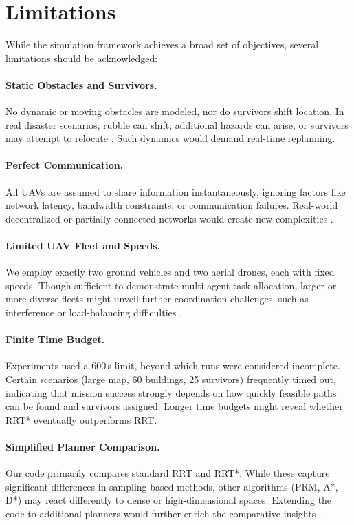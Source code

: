 \documentclass[12pt,a4paper]{report}
\begin{document}
\section{Limitations}
\label{sec:limitations}
While the simulation framework achieves a broad set of objectives, several limitations
should be acknowledged:

\paragraph{Static Obstacles and Survivors.}
No dynamic or moving obstacles are modeled, nor do survivors shift location. In real
disaster scenarios, rubble can shift, additional hazards can arise, or survivors may
attempt to relocate \cite{Auclair2021CollapseRisk,Oleynikova2018ReplanDynamic}. Such dynamics would demand real-time replanning.

\paragraph{Perfect Communication.}
All UAVs are assumed to share information instantaneously, ignoring factors like
network latency, bandwidth constraints, or communication failures. Real-world
decentralized or partially connected networks would create new complexities \cite{Dias2006MarketBased}.

\paragraph{Limited UAV Fleet and Speeds.}
We employ exactly two ground vehicles and two aerial drones, each with fixed speeds.
Though sufficient to demonstrate multi-agent task allocation, larger or more diverse
fleets might unveil further coordination challenges, such as interference or
load-balancing difficulties \cite{Gerkey2004Taxonomy}.

\paragraph{Finite Time Budget.}
Experiments used a 600\,s limit, beyond which runs were considered incomplete. Certain
scenarios (large map, 60 buildings, 25 survivors) frequently timed out, indicating
that mission success strongly depends on how quickly feasible paths can be found and
survivors assigned. Longer time budgets might reveal whether RRT* eventually outperforms RRT.

\paragraph{Simplified Planner Comparison.}
Our code primarily compares standard RRT and RRT*. While these capture significant
differences in sampling-based methods, other algorithms (PRM, A*, D*) may react
differently to dense or high-dimensional spaces. Extending the code to additional
planners would further enrich the comparative insights \cite{Orthey2024SBMPReview}.
\end{document}
